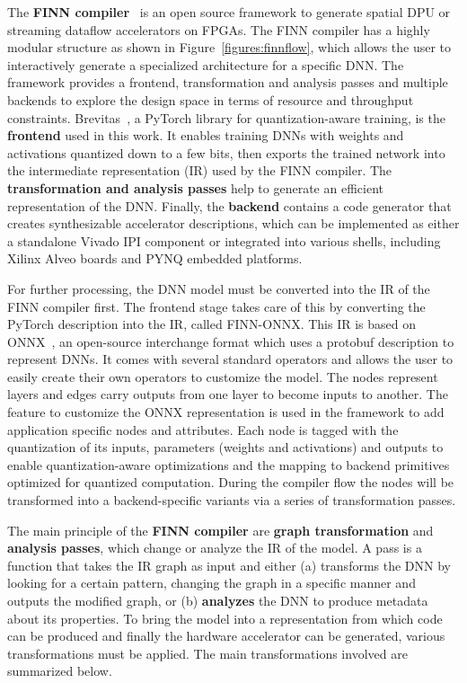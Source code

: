 The \textbf{FINN compiler}~\cite{umuroglu2017finn} is an open source framework to generate spatial DPU or streaming dataflow accelerators on FPGAs. 
The FINN compiler has a highly modular structure as shown in Figure~\ref{figures:finnflow}, which allows the user to interactively generate a specialized architecture for a specific DNN. 
The framework provides a frontend, transformation and analysis passes and multiple backends to explore the design space in terms of resource and throughput constraints.
Brevitas~\cite{brevitas}, a PyTorch library for quantization-aware training, is the \textbf{frontend} used in this work.
It enables training DNNs with weights and activations quantized down to a few bits, then exports the trained network into the intermediate representation (IR) used by the FINN compiler. 
The \textbf{transformation and analysis passes} help to generate an efficient representation of the DNN. Finally, the \textbf{backend} contains a code generator that creates synthesizable accelerator descriptions, which can be implemented as either a standalone Vivado IPI component or integrated into various shells, including Xilinx Alveo boards and PYNQ embedded platforms.

For further processing, the DNN model must be converted into the IR of the FINN compiler first. The frontend stage takes care of this by converting the PyTorch description into the IR, called FINN-ONNX. This IR is based on ONNX~\cite{onnx_github}, an open-source interchange format which uses a protobuf description to represent DNNs. It comes with several standard operators and allows the user to easily create their own operators to customize the model. The nodes represent layers and edges carry outputs from one layer to become inputs to another. The feature to customize the ONNX representation is used in the framework to add application specific nodes and attributes. Each node is tagged with the quantization of its inputs, parameters (weights and activations) and outputs to enable quantization-aware optimizations and the mapping to backend primitives optimized for quantized computation. During the compiler flow the nodes will be transformed into a backend-specific variants via a series of transformation passes. 

The main principle of the \textbf{FINN compiler} are \textbf{graph transformation} and \textbf{analysis passes}, which change or analyze the IR of the model. A pass is a function that takes the IR graph as input and either (a) transforms the DNN by looking for a certain pattern, changing the graph in a specific manner and outputs the modified graph, or (b) \textbf{analyzes} the DNN to produce metadata about its properties. To bring the model into a representation from which code can be produced and finally the hardware accelerator can be generated, various transformations must be applied. The main transformations involved  are summarized below.

